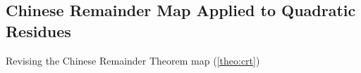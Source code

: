 \subsection{Chinese Remainder Map Applied to Quadratic Residues}
Revising the Chinese Remainder Theorem map (\ref{theo:crt})